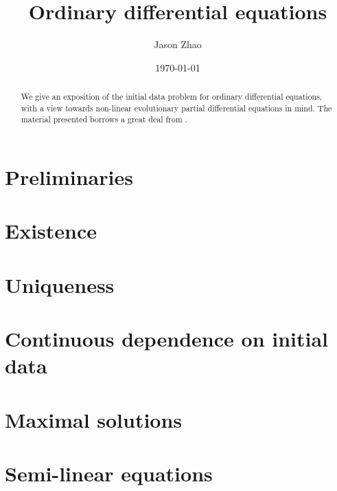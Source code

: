 \documentclass[reqno]{amsart}
\title
{
	{Ordinary differential equations}
}
\author{Jason Zhao}
\date{\today}
\begin{document}
\maketitle

\begin{abstract}
	We give an exposition of the initial data problem for ordinary differential equations, with a view towards non-linear evolutionary partial differential equations in mind. The material presented borrows a great deal from \cite[Chapter 1]{Tao2006}. 
\end{abstract}

\tableofcontents

\section{Preliminaries}


\section{Existence}


\section{Uniqueness}


\section{Continuous dependence on initial data}


\section{Maximal solutions}


\section{Semi-linear equations}




\end{document}
